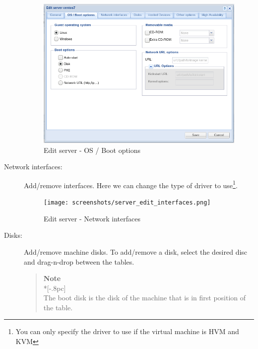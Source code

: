 \begin{description}
		\begin{figure}[H]
        		\begin{center}
		        \includegraphics[scale=0.5]{screenshots/server_edit_options.png}
        		\caption{Edit server - OS / Boot options}
	        	\label{fig:server_edit_options}
	        	\end{center}
		\end{figure}

	\item[Network interfaces:] Add/remove interfaces. Here we can change the type of driver to use\footnote{You can only specify the driver to use if the virtual machine is HVM and KVM}.
		\begin{figure}[H]
        		\begin{center}
		        \texttt{[image: screenshots/server\_edit\_interfaces.png]}
        		\caption{Edit server - Network interfaces}
	        	\label{fig:server_edit_interfaces}
	        	\end{center}
		\end{figure}

	\item[Disks:] Add/remove machine disks. To add/remove a disk, select the desired disc and drag-n-drop between the tables.
                    
                \begin{quote}
                    {\large \bf Note} \\*[-.8pc]
                    \underline{\hspace{6in}} \\
                    The boot disk is the disk of the machine that is in first position of the table.
                \end{quote}
                    

\end{description}

